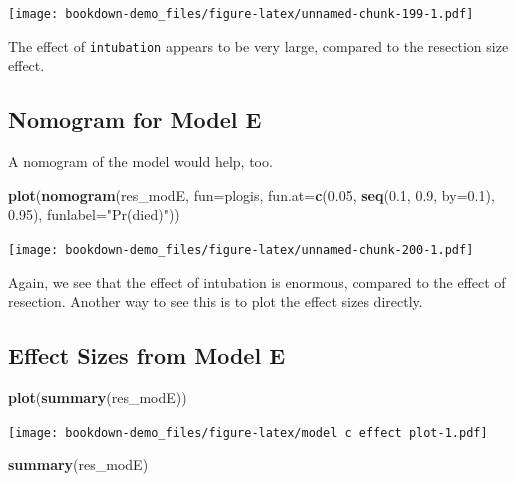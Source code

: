 \documentclass[]{book}
\newenvironment{Shaded}{\begin{snugshade}}{\end{snugshade}}
\newcommand{\KeywordTok}[1]{\textcolor[rgb]{0.13,0.29,0.53}{\textbf{#1}}}
\newcommand{\DataTypeTok}[1]{\textcolor[rgb]{0.13,0.29,0.53}{#1}}
\newcommand{\FloatTok}[1]{\textcolor[rgb]{0.00,0.00,0.81}{#1}}
\newcommand{\StringTok}[1]{\textcolor[rgb]{0.31,0.60,0.02}{#1}}
\newcommand{\NormalTok}[1]{#1}
\theoremstyle{definition}
\theoremstyle{definition}
\theoremstyle{definition}
\theoremstyle{remark}
\begin{document}
\texttt{[image: bookdown-demo\_files/figure-latex/unnamed-chunk-199-1.pdf]}

The effect of \texttt{intubation} appears to be very large, compared to
the resection size effect.

\subsection{Nomogram for Model E}\label{nomogram-for-model-e}

A nomogram of the model would help, too.

\begin{Shaded}
\begin{Highlighting}[]
\KeywordTok{plot}\NormalTok{(}\KeywordTok{nomogram}\NormalTok{(res_modE, }\DataTypeTok{fun=}\NormalTok{plogis, }
              \DataTypeTok{fun.at=}\KeywordTok{c}\NormalTok{(}\FloatTok{0.05}\NormalTok{, }\KeywordTok{seq}\NormalTok{(}\FloatTok{0.1}\NormalTok{, }\FloatTok{0.9}\NormalTok{, }\DataTypeTok{by=}\FloatTok{0.1}\NormalTok{), }\FloatTok{0.95}\NormalTok{), }
              \DataTypeTok{funlabel=}\StringTok{"Pr(died)"}\NormalTok{))}
\end{Highlighting}
\end{Shaded}

\texttt{[image: bookdown-demo\_files/figure-latex/unnamed-chunk-200-1.pdf]}

Again, we see that the effect of intubation is enormous, compared to the
effect of resection. Another way to see this is to plot the effect sizes
directly.

\subsection{Effect Sizes from Model E}\label{effect-sizes-from-model-e}

\begin{Shaded}
\begin{Highlighting}[]
\KeywordTok{plot}\NormalTok{(}\KeywordTok{summary}\NormalTok{(res_modE))}
\end{Highlighting}
\end{Shaded}

\texttt{[image: bookdown-demo\_files/figure-latex/model c effect plot-1.pdf]}

\begin{Shaded}
\begin{Highlighting}[]
\KeywordTok{summary}\NormalTok{(res_modE)}
\end{Highlighting}
\end{Shaded}
\end{document}
